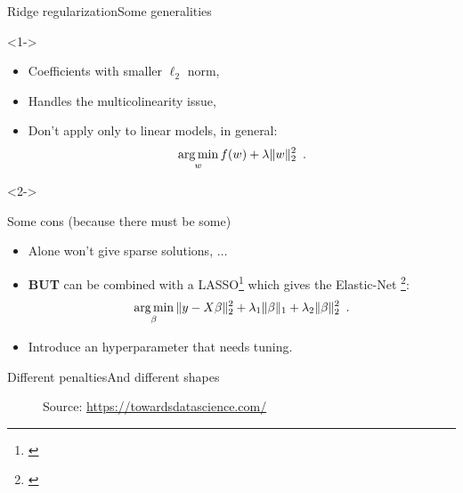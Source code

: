 \documentclass[10pt,aspectratio=43]{beamer}
\begin{document}
\begin{frame}{Ridge regularization}{Some generalities}
    \begin{onlyenv}<1->
    \begin{itemize}
        \item<1-> Coefficients with smaller $\ell_2$ norm,
        \item<1-> Handles the multicolinearity issue,
        \item<1-> Don't apply only to linear models, in general:
        \[\mathop{\mathrm{arg\,min}}_w f(w) + \lambda \|w\|^2_2 \enspace.\]
    \end{itemize}
\end{onlyenv}
\begin{onlyenv}<2->
        \begin{block}{Some cons (because there must be some)}
            \begin{itemize}
        \item<2-> Alone won't give sparse solutions, $\dots$
        \item<2-> \textbf{BUT} can be combined with a LASSO\footnote[frame]{\citet{Tibshirani96}} which gives the Elastic-Net \footnote[frame]{\citet{Zou_Hastie05}}:
        \[\mathop{\mathrm{arg\,min}}_\beta \|y-X\beta\|_2^2 + \lambda_1 \|\beta\|_1 + \lambda_2 \|\beta\|_2^2\enspace.\]
        \item<2-> Introduce an hyperparameter that needs tuning.
            \end{itemize}
        \end{block}
    \end{onlyenv}
\end{frame}

\begin{frame}{Different penalties}{And different shapes}
    \begin{figure}
        \centering
           {Source: \url{https://towardsdatascience.com/}}
    \end{figure}

\end{frame}
\end{document}
